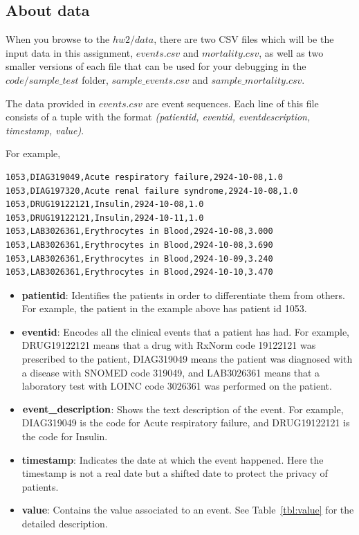 \documentclass[12pt]{article}
\begin{document}
\subsection*{About data}
When you browse to the $hw2/data$, there are two CSV files which will be the input data in this assignment, \textit{$events.csv$} and \textit{$mortality.csv$}, as well as two smaller versions of each file that can be used for your debugging in the $code/sample\_test$ folder, \textit{$sample\_events.csv$} and \textit{$sample\_mortality.csv$}.

The data provided in \textit{$events.csv$} are event sequences. Each line of this file consists of a tuple with the format \textit{(patient\textunderscore id, event\textunderscore id, event\textunderscore description, timestamp, value)}. 

For example, 

\begin{lstlisting}[frame=single, language=bash]
1053,DIAG319049,Acute respiratory failure,2924-10-08,1.0
1053,DIAG197320,Acute renal failure syndrome,2924-10-08,1.0
1053,DRUG19122121,Insulin,2924-10-08,1.0
1053,DRUG19122121,Insulin,2924-10-11,1.0
1053,LAB3026361,Erythrocytes in Blood,2924-10-08,3.000
1053,LAB3026361,Erythrocytes in Blood,2924-10-08,3.690
1053,LAB3026361,Erythrocytes in Blood,2924-10-09,3.240
1053,LAB3026361,Erythrocytes in Blood,2924-10-10,3.470
\end{lstlisting}

\begin{itemize}
\item \textbf{patient\textunderscore id}: Identifies the patients in order to differentiate them from others. For example, the patient in the example above has patient id 1053. 
\item \textbf{event\textunderscore id}: Encodes all the clinical events that a patient has had. For example, DRUG19122121 means that a drug with RxNorm code 19122121 was prescribed to the patient, DIAG319049 means the patient was diagnosed with a disease with SNOMED code 319049, and LAB3026361 means that a laboratory test with LOINC code 3026361 was performed on the patient.
\item $\textbf{event\textunderscore description}$: Shows the text description of the event. For example, DIAG319049 is the code for Acute respiratory failure, and DRUG19122121 is the code for Insulin. 
\item \textbf{timestamp}: Indicates the date at which the event happened. Here the timestamp is not a real date but a shifted date to protect the privacy of patients.
\item \textbf{value}: Contains the value associated to an event. See Table~\ref{tbl:value} for the detailed description.
\end{itemize}
\end{document}
